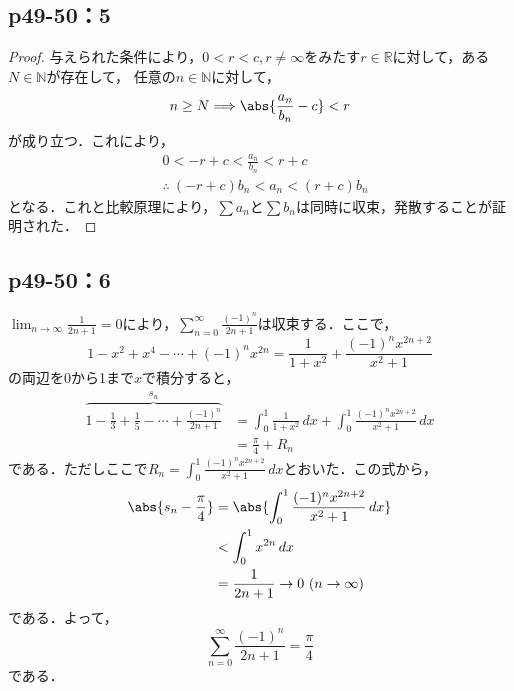 \documentclass[uplatex,dvipdfmx,a4paper,10pt,fleqn]{jsarticle}
\begin{document}
    \subsection*{p49-50：5}

    \begin{tleftbar}
        \begin{proof}
            与えられた条件により，$0 <r <c , r \ne \infty $をみたす$r \in \mathbb{R}$に対して，ある$N \in \mathbb{N}$が存在して，
            任意の$n \in \mathbb{N}$に対して，
            \[
                n \ge N \Longrightarrow \abs{\frac{a_n}{b_n}-c}<r
            \]
            が成り立つ．これにより，
            \begin{align*}
                & 0<-r +c < \frac{a_n}{b_n} < r+c \\
                &\therefore ~  (-r+c) b_n < a_n < (r+c) b_n
            \end{align*}
            となる．これと比較原理により，$\sum a_n$と$\sum b_n$は同時に収束，発散することが証明された．
        \end{proof}
    \end{tleftbar}

    \subsection*{p49-50：6}
    \begin{tleftbar}
        $\lim_{n \to \infty} \frac{1}{2n+1} =0$により，$\sum_{n=0}^{\infty} \frac{(-1)^n}{2n+1}$は収束する．ここで，
        \[
             1-x^2+x^4-\cdots+(-1)^n x^{2n} =\frac{1}{1+x^2} +\frac{(-1)^n x^{2n+2}}{x^2+1}
        \]
    の両辺を0から1まで$x$で積分すると，
    \begin{align*}
       \overbrace{1-\frac{1}{3}+\frac{1}{5}-\cdots+\frac{(-1)^n}{2n+1}}^{s_n} &=\int_{0}^{1} \frac{1}{1+x^2} \, dx +\int_{0}^{1}\frac{(-1)^n x^{2n+2}}{x^2+1}  \, dx \\
    & = \frac{\pi}{4} + R_n
    \end{align*}
    である．ただしここで$R_n =\int_{0}^{1}\frac{(-1)^n x^{2n+2}}{x^2+1} \, dx$とおいた．この式から，
    \begin{align*}
      \abs{s_n -\frac{\pi}{4}  } & = \abs{\int_{0}^{1}\frac{(-1)^n x^{2n+2}}{x^2+1} \, dx } \\
       & < \int_{0}^{1} x^{2n} \, dx \\
       & =\frac{1}{2n+1} \to 0 ~(n \to \infty)
    \end{align*}
    である．よって，
    \[
        \sum_{n=0}^{\infty} \frac{(-1)^n}{2n+1} =\frac{\pi}{4}
    \]
    である．
    \end{tleftbar}
\end{document}
